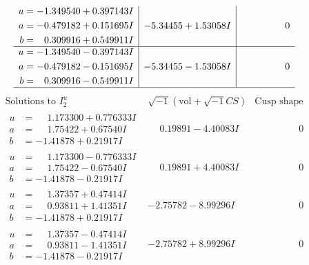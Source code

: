 \documentclass[1p]{elsarticle_modified}
\theoremstyle{definition}
\newcommand{\I}{\sqrt{-1}}
\begin{document}
$$\begin{array}{c|c|c}
\begin{aligned}
u &= -1.349540 + 0.397143 I \\
a &= -0.479182 + 0.151695 I \\
b &= \phantom{-}0.309916 + 0.549911 I\end{aligned}
 & -5.34455 + 1.53058 I & \phantom{-0.000000 } 0 \\ \hline\begin{aligned}
u &= -1.349540 - 0.397143 I \\
a &= -0.479182 - 0.151695 I \\
b &= \phantom{-}0.309916 - 0.549911 I\end{aligned}
 & -5.34455 - 1.53058 I & \phantom{-0.000000 } 0\\
 \hline 
 \end{array}$$\newpage$$\begin{array}{c|c|c}  
\text{Solutions to }I^u_{2}& \I (\text{vol} + \sqrt{-1}CS) & \text{Cusp shape}\\
 \hline 
\begin{aligned}
u &= \phantom{-}1.173300 + 0.776333 I \\
a &= \phantom{-}1.75422 + 0.67540 I \\
b &= -1.41878 + 0.21917 I\end{aligned}
 & \phantom{-}0.19891 - 4.40083 I & \phantom{-0.000000 } 0 \\ \hline\begin{aligned}
u &= \phantom{-}1.173300 - 0.776333 I \\
a &= \phantom{-}1.75422 - 0.67540 I \\
b &= -1.41878 - 0.21917 I\end{aligned}
 & \phantom{-}0.19891 + 4.40083 I & \phantom{-0.000000 } 0 \\ \hline\begin{aligned}
u &= \phantom{-}1.37357 + 0.47414 I \\
a &= \phantom{-}0.93811 + 1.41351 I \\
b &= -1.41878 + 0.21917 I\end{aligned}
 & -2.75782 - 8.99296 I & \phantom{-0.000000 } 0 \\ \hline\begin{aligned}
u &= \phantom{-}1.37357 - 0.47414 I \\
a &= \phantom{-}0.93811 - 1.41351 I \\
b &= -1.41878 - 0.21917 I\end{aligned}
 & -2.75782 + 8.99296 I & \phantom{-0.000000 } 0 \\ \hline\begin{aligned}

\end{aligned}
\end{array}$$
\end{document}
